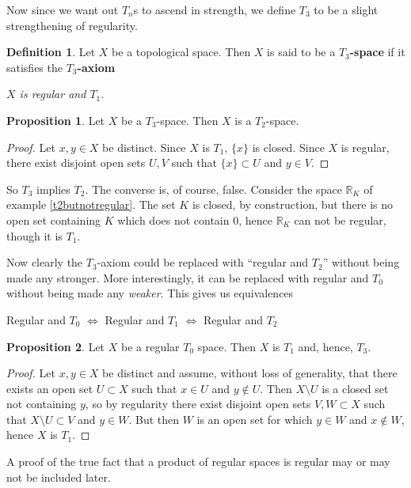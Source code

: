 \documentclass{book}
\theoremstyle{definition}
\newtheorem{proposition}{Proposition}[section]
\newtheorem{definition}{Definition}[section]
\theoremstyle{remark}
\newcommand{\R}{\mathbb{R}}
\begin{document}
Now since we want out $T_n$s to ascend in strength, we define $T_3$ to be a slight strengthening of regularity.

\begin{definition}
Let $X$ be a topological space. Then $X$ is said to be a \textbf{$T_3$-space} if it satisfies the \textbf{$T_3$-axiom}
\begin{center}
    \textit{$X$ is regular and $T_1$.}
\end{center}
\end{definition}

\begin{proposition}
Let $X$ be a $T_3$-space. Then $X$ is a $T_2$-space.
\end{proposition}
\begin{proof}
Let $x,y\in X$ be distinct. Since $X$ is $T_1$, $\{x\}$ is closed. Since $X$ is regular, there exist disjoint open sets $U,V$ such that $\{x\}\subset U$ and $y\in V$.
\end{proof}

So $T_3$ implies $T_2$. The converse is, of course, false. Consider the space $\R_K$ of example \ref{t2butnotregular}. The set $K$ is closed, by construction, but there is no open set containing $K$ which does not contain 0, hence $\R_K$ can not be regular, though it is $T_1$.

Now clearly the $T_3$-axiom could be replaced with ``regular and $T_2$'' without being made any stronger. More interestingly, it can be replaced with regular and $T_0$ without being made any \textit{weaker}. This gives us equivalences
\begin{center} Regular and $T_0$ $\Leftrightarrow$ Regular and $T_1$ $\Leftrightarrow$ Regular and $T_2$
\end{center}
\begin{proposition}
Let $X$ be a regular $T_0$ space. Then $X$ is $T_1$ and, hence, $T_3$.
\end{proposition}
\begin{proof}
Let $x,y\in X$ be distinct and assume, without loss of generality, that there exists an open set $U\subset X$ such that $x\in U$ and $y\notin U$. Then $X\setminus U$ is a closed set not containing $y$, so by regularity there exist disjoint open sets $V,W\subset X$ such that $X\setminus U\subset V$ and $y\in W$. But then $W$ is an open set for which $y\in W$ and $x\notin W$, hence $X$ is $T_1$.
\end{proof}

A proof of the true fact that a product of regular spaces is regular may or may not be included later.
\end{document}
